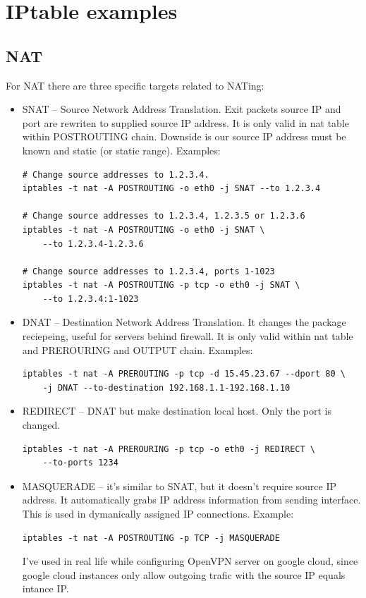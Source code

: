 \documentclass[times, utf8, seminar, english]{fer}
\begin{document}
\chapter{IPtable examples}

\section{NAT}
\label{sec:NAT}

For NAT there are three specific targets related to NATing:
\begin{itemize}
    \item SNAT -- Source Network Address Translation. Exit packets source IP and port are rewriten to supplied source IP address. It is only valid in nat table within POSTROUTING chain. Downside is our source IP address must be known and static (or static range). Examples:
    \begin{verbatim}
# Change source addresses to 1.2.3.4.
iptables -t nat -A POSTROUTING -o eth0 -j SNAT --to 1.2.3.4

# Change source addresses to 1.2.3.4, 1.2.3.5 or 1.2.3.6
iptables -t nat -A POSTROUTING -o eth0 -j SNAT \
    --to 1.2.3.4-1.2.3.6

# Change source addresses to 1.2.3.4, ports 1-1023
iptables -t nat -A POSTROUTING -p tcp -o eth0 -j SNAT \
    --to 1.2.3.4:1-1023
    \end{verbatim}
    \item DNAT -- Destination Network Address Translation. It changes the package reciepeing, useful for servers behind firewall. It is only valid within nat table and PREROURING and OUTPUT chain. Examples:
    \begin{verbatim}
iptables -t nat -A PREROUTING -p tcp -d 15.45.23.67 --dport 80 \
    -j DNAT --to-destination 192.168.1.1-192.168.1.10
    \end{verbatim}
    \item REDIRECT -- DNAT but make destination local host. Only the port is changed.
    \begin{verbatim}
iptables -t nat -A PREROURING -p tcp -o eth0 -j REDIRECT \
    --to-ports 1234
    \end{verbatim}
    \item MASQUERADE -- it's similar to SNAT, but it doesn't require source IP address. It automatically grabs IP address information from sending interface. This is used in dymanically assigned IP connections. Example:
    \begin{verbatim}
iptables -t nat -A POSTROUTING -p TCP -j MASQUERADE
    \end{verbatim}
    I've used in real life while configuring OpenVPN server on google cloud, since google cloud instances only allow outgoing trafic with the source IP equals intance IP.
\end{itemize}
\end{document}

